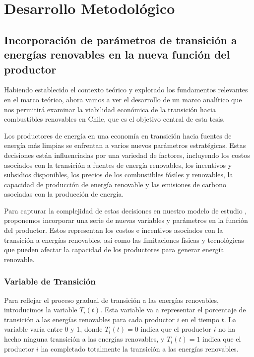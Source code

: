 
\chapter{Desarrollo Metodológico}
\label{c3} %

\section{Incorporación de parámetros de transición a energías renovables en la nueva función del productor}\label{c31}

Habiendo establecido el contexto teórico y explorado los fundamentos relevantes en el marco teórico, ahora vamos a ver el desarrollo de un marco analítico que nos permitirá examinar la viabilidad económica de la transición hacia combustibles renovables en Chile, que es el objetivo central de esta tesis.\vspace{2.5mm}

Los productores de energía en una economía en transición hacia fuentes de energía más limpias se enfrentan a varios nuevos parámetros estratégicas. Estas decisiones están influenciadas por una variedad de factores, incluyendo los costos asociados con la transición a fuentes de energía renovables, los incentivos y subsidios disponibles, los precios de los combustibles fósiles y renovables, la capacidad de producción de energía renovable y las emisiones de carbono asociadas con la producción de energía.\vspace{2.5mm}

Para capturar la complejidad de estas decisiones en nuestro modelo de estudio , proponemos incorporar una serie de nuevas variables y parámetros en la función del productor. Estos representan los costos e incentivos asociados con la transición a energías renovables, así como las limitaciones físicas y tecnológicas que pueden afectar la capacidad de los productores para generar energía renovable.\vspace{2.5mm}

\subsection{Variable de Transición}\label{c32}

Para reflejar el proceso gradual de transición a las energías renovables, introducimos la variable \( T_i(t) \). Esta variable va a representar el porcentaje de transición a las energías renovables para cada productor \( i \) en el tiempo \( t \). La variable varía entre 0 y 1, donde \( T_i(t) = 0 \) indica que el productor \( i \) no ha hecho ninguna transición a las energías renovables, y \( T_i(t) = 1 \) indica que el productor \( i \) ha completado totalmente la transición a las energías renovables. \vspace{2.5mm}

